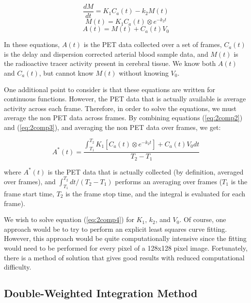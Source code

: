 \begin{equation}
\frac{dM}{dt} = K_{1}C_{a}(t) - k_{2}M(t)      \label{eq:2comp1}
\end{equation}
\begin{equation}
M(t) = K_{1}C_{a}(t) \otimes e^{-k_{2}t}       \label{eq:2comp2}
\end{equation}
\begin{equation}
A(t) = M(t) + C_{a}(t)V_{0}                    \label{eq:2comp3}
\end{equation}

In these equations, $A(t)$ is the PET data collected over a set of
frames, $C_{a}(t)$ is the delay and dispersion corrected arterial
blood sample data, and $M(t)$ is the radioactive tracer activity
present in cerebral tissue.  We know both $A(t)$ and $C_{a}(t)$, but
cannot know $M(t)$ without knowing $V_{0}$.

One additional point to consider is that these equations are written
for continuous functions.  However, the PET data that is actually
available is average activity across each frame.  Therefore, in
order to solve the equations, we must average the non PET data
across frames.  By combining equations (\ref{eq:2comp2}) and
(\ref{eq:2comp3}), and averaging the non PET data over frames, we
get:

\begin{equation}
A^{*}(t) = \frac{\int_{T_1}^{T_2} K_{1} \left[ C_{a}(t) \otimes
e^{-k_{2}t} \right] + C_{a}(t)V_{0} dt}{T_{2} - T_{1}}
\label{eq:2comp4}
\end{equation}

where $A^{*}(t)$ is the PET data that is actually collected (by
definition, averaged over frames), and ${\int_{T_1}^{T_2}dt} / {(T_2 -
T_1)}$ performs an averaging over frames ($T_1$ is the frame start
time, $T_2$ is the frame stop time, and the integral is evaluated for
each frame).

We wish to solve equation (\ref{eq:2comp4}) for $K_{1}$, $k_{2}$, and
$V_{0}$.  Of course, one approach would be to try to perform an
explicit least squares curve fitting.  However, this approach would be
quite computationally intensive since the fitting would need to be
performed for every pixel of a 128x128 pixel image.  Fortunately,
there is a method of solution that gives good results with reduced
computational difficulty.

\subsection{Double-Weighted Integration Method}

